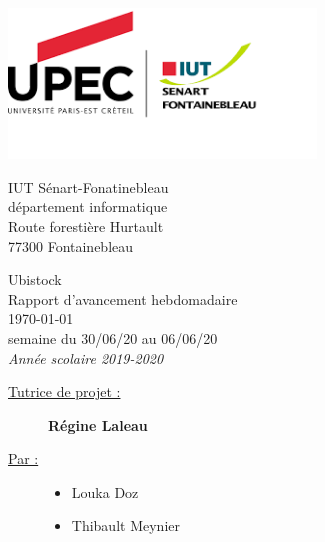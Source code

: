 \documentclass[a4paper, 12pt]{report}
\title{}
\author{
	Louka Doz
	\and 
	Thibault Meynier
}
\date{\raggedleft \today}
\begin{document}
	\makeatletter
	\begin{titlepage}

		\begin{flushleft}
			\begin{minipage}{4cm}
				\includegraphics[height=4cm]{img/logo_iut}
			\end{minipage}
			\hfill
			\begin{minipage}{5cm}
				\begin{flushright}
		        	\small IUT Sénart-Fonatinebleau\\
		        	département informatique\\
		        	Route forestière Hurtault\\
		        	77300 Fontainebleau\\
				\end{flushright}
			\end{minipage}
		\end{flushleft}

		\vfill

		\begin{center}
	        \vspace*{3cm}%
	        {\HUGE Ubistock}\\[0.5cm]
	        {\huge Rapport d'avancement hebdomadaire}\\[0.5cm]
	        {\Large \today}\\[0.5cm]
	        {\Large semaine du 30/06/20 au 06/06/20}\\[0.5cm]
        	{\large \textit{Année scolaire 2019-2020}}\\[1cm]
	    \end{center}
	    \vfill
        \begin{raggedright}
	        \begin{description}
	        	\item[\large \underline{Tutrice de projet :}] \large \textbf{Régine Laleau}\\[1cm]
	        	\item[\underline{Par :}] 
		        	\begin{itemize}
			        		\item Louka Doz
			        		\item Thibault Meynier
			        \end{itemize}
	        \end{description}
        \end{raggedright}        
	    \let\newpage\relax%
	\end{titlepage}
	\makeatother
\end{document}
